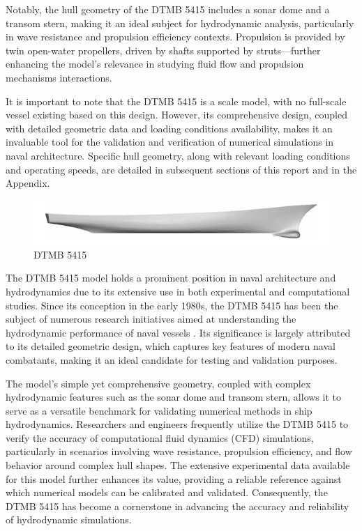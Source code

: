 \documentclass[12pt]{article} %
\begin{document}
Notably, the hull geometry of the DTMB 5415 includes a sonar dome and a transom stern, making it 
an ideal subject for hydrodynamic analysis, particularly in wave resistance and propulsion efficiency 
contexts. Propulsion is provided by twin open-water propellers, driven by shafts supported by 
struts—further enhancing the model’s relevance in studying fluid flow and propulsion mechanisms 
interactions.

It is important to note that the DTMB 5415 is a scale model, with no full-scale vessel existing 
based on this design. However, its comprehensive design, coupled with detailed geometric data and 
loading conditions availability, makes it an invaluable tool for the validation and verification of 
numerical simulations in naval architecture. Specific hull geometry, along with relevant loading 
conditions and operating speeds, are detailed in subsequent sections of this report and in the Appendix.

\begin{figure}[ht]
\centering
\includegraphics[width=1\textwidth]{DTMB.png}
\caption{DTMB 5415}
\end{figure}

The DTMB 5415 model holds a prominent position in naval architecture and hydrodynamics due to 
its extensive use in both experimental and computational studies. Since its conception in the 
early 1980s, the DTMB 5415 has been the subject of numerous research initiatives aimed at understanding 
the hydrodynamic performance of naval vessels \cite{elhadad2023}. Its significance is largely 
attributed to its detailed geometric design, which captures key features of modern naval combatants, 
making it an ideal candidate for testing and validation purposes.

The model’s simple yet comprehensive geometry, coupled with complex hydrodynamic features such 
as the sonar dome and transom stern, allows it to serve as a versatile benchmark for validating 
numerical methods in ship hydrodynamics. Researchers and engineers frequently utilize the DTMB 
5415 to verify the accuracy of computational fluid dynamics (CFD) simulations, particularly in 
scenarios involving wave resistance, propulsion efficiency, and flow behavior around complex 
hull shapes\cite{elhadad2023}. The extensive experimental data available for this model further 
enhances its value, 
providing a reliable reference against which numerical models can be calibrated and validated. 
Consequently, the DTMB 5415 has become a cornerstone in advancing the accuracy and reliability of 
hydrodynamic simulations.
\end{document}
